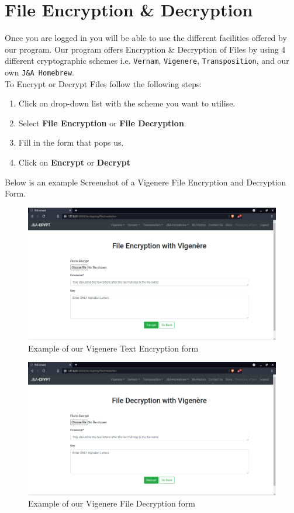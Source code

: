 \documentclass[a4paper, 12pt, titlepage]{report}
\begin{document}
\section{File Encryption \& Decryption}
Once you are logged in you will be able to use the different facilities offered by our program. Our program offers Encryption \& Decryption of Files by using 4 different cryptographic schemes i.e. \texttt{Vernam}, \texttt{Vigenere}, \texttt{Transposition}, and our own \texttt{J\&A Homebrew}.\\
To Encrypt or Decrypt Files follow the following steps:
\begin{enumerate}
\item Click on drop-down list with the scheme you want to utilise.
\item Select \textbf{File Encryption} or \textbf{File Decryption}.
\item Fill in the form that pops us.
\item Click on \textbf{Encrypt} or \textbf{Decrypt}
\end{enumerate}
Below is an example Screenshot of a Vigenere File Encryption and Decryption Form.
\begin{figure}[H]
\centering
\includegraphics[scale=0.3]{./pics/vigfileenc}
\caption{Example of our Vigenere Text Encryption form}
\end{figure}
\begin{figure}[H]
\centering
\includegraphics[scale=0.3]{./pics/vigfiledec}
\caption{Example of our Vigenere File Decryption form}
\end{figure}
\end{document}

